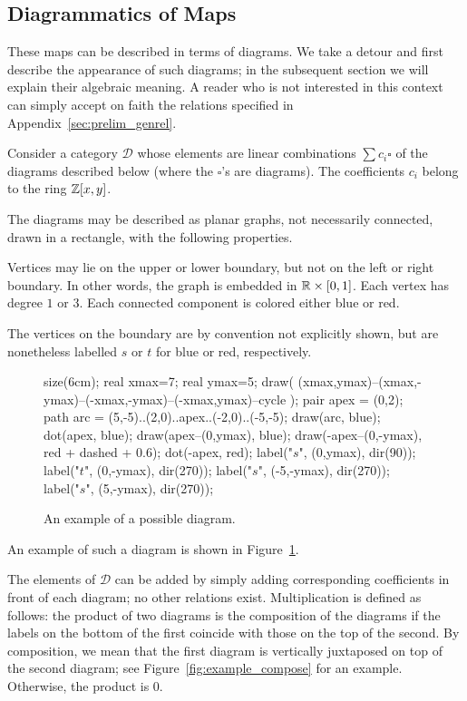 \subsection{Diagrammatics of Maps}
\label{sec:prelim_map}
\newcommand{\DD}{\mathcal D}
These maps can be described in terms of diagrams.  We take a detour and first describe the appearance of such diagrams; in the subsequent section we will explain their algebraic meaning.  A reader who is not interested in this context can simply accept on faith the relations specified in Appendix~\ref{sec:prelim_genrel}.

Consider a category $\DD$ whose elements are linear combinations $\sum c_i \square$ of the diagrams described below (where the $\square$'s are diagrams).  The coefficients $c_i$ belong to the ring $\mathbb Z[x,y]$.

The diagrams may be described as planar graphs, not necessarily connected, drawn in a rectangle, with the following properties.
\begin{enumerate}[(i)]
	\ii Vertices may lie on the upper or lower boundary, but not on the left or right boundary.  In other words, the graph is embedded in $\mathbb R \times [0,1]$.
	\ii Each vertex has degree $1$ or $3$.
	\ii Each connected component is colored either blue or red.
\end{enumerate}
The vertices on the boundary are by convention not explicitly shown, but are nonetheless labelled $s$ or $t$ for blue or red, respectively.

\begin{figure}[ht]
	\centering
	\begin{asy}
	size(6cm);
	real xmax=7;
	real ymax=5;
	draw( (xmax,ymax)--(xmax,-ymax)--(-xmax,-ymax)--(-xmax,ymax)--cycle );
	pair apex = (0,2);
	path arc = (5,-5)..(2,0)..apex..(-2,0)..(-5,-5);
	draw(arc, blue);
	dot(apex, blue);
	draw(apex--(0,ymax), blue);
	draw(-apex--(0,-ymax), red + dashed + 0.6);
	dot(-apex, red);
	label("$s$", (0,ymax), dir(90));
	label("$t$", (0,-ymax), dir(270));
	label("$s$", (-5,-ymax), dir(270));
	label("$s$", (5,-ymax), dir(270));
	\end{asy}
	\caption{An example of a possible diagram.}
	\label{fig:example_diagram}
\end{figure}

An example of such a diagram is shown in Figure~\ref{fig:example_diagram}.

The elements of $\DD$ can be added by simply adding corresponding coefficients in front of each diagram; no other relations exist.  Multiplication is defined as follows: the product of two diagrams is the composition of the diagrams if the labels on the bottom of the first coincide with those on the top of the second.  By composition, we mean that the first diagram is vertically juxtaposed on top of the second diagram; see Figure~\ref{fig:example_compose} for an example.  Otherwise, the product is $0$.

